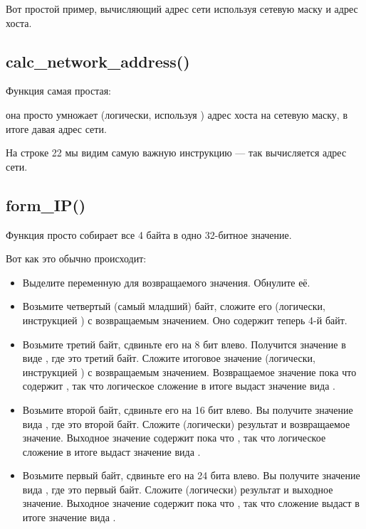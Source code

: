 Вот простой пример, вычисляющий адрес сети используя сетевую маску и адрес хоста.



\subsection{calc\_network\_address()}

Функция  самая простая: 

она просто умножает (логически, используя \AND) адрес хоста на сетевую маску, в итоге давая адрес
сети.



На строке 22 мы видим самую важную инструкцию \AND --- так вычисляется адрес сети.

\subsection{form\_IP()}

Функция  просто собирает все 4 байта в одно 32-битное значение.

Вот как это обычно происходит:

\begin{itemize}
\item Выделите переменную для возвращаемого значения. Обнулите её.

\item 
Возьмите четвертый (самый младший) байт, сложите его (логически, инструкцией \OR) с возвращаемым
значением. Оно содержит теперь 4-й байт.

\item Возьмите третий байт, сдвиньте его на 8 бит влево.
Получится значение в виде , где  это третий байт.
Сложите итоговое значение (логически, инструкцией \OR) с возвращаемым значением.
Возвращаемое значение пока что содержит , так что логическое сложение
в итоге выдаст значение вида .

\item 
Возьмите второй байт, сдвиньте его на 16 бит влево.
Вы получите значение вида , где  это второй байт.
Сложите (логически) результат и возвращаемое значение.
Выходное значение содержит пока что , так что логическое сложение
в итоге выдаст значение вида .

\item 
Возьмите первый байт, сдвиньте его на 24 бита влево.
Вы получите значение вида , где  это первый байт.
Сложите (логически) результат и выходное значение.
Выходное значение содержит пока что , так что сложение выдаст в итоге значение
вида .

\end{itemize}

